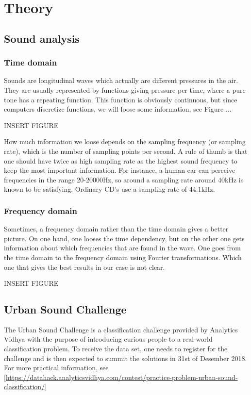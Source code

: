 \section{Theory} \label{sec:theory}

\subsection{Sound analysis}

\subsubsection{Time domain}
Sounds are longitudinal waves which actually are different pressures in the air. They are usually represented by functions giving pressure per time, where a pure tone has a repeating function. This function is obviously continuous, but since computers discretize functions, we will loose some information, see Figure ...

INSERT FIGURE

How much information we loose depends on the sampling frequency (or sampling rate), which is the number of sampling points per second. A rule of thumb is that one should have twice as high sampling rate as the highest sound frequency to keep the most important information. For instance, a human ear can perceive frequencies in the range 20-20000Hz, so around a sampling rate around 40kHz is known to be satisfying. Ordinary CD's use a sampling rate of 44.1kHz. 

\subsubsection{Frequency domain}
Sometimes, a frequency domain rather than the time domain gives a better picture. On one hand, one looses the time dependency, but on the other one gets information about which frequencies that are found in the wave. One goes from the time domain to the frequency domain using Fourier transformations. Which one that gives the best results in our case is not clear. 

INSERT FIGURE

\subsection{Urban Sound Challenge}
The Urban Sound Challenge is a classification challenge provided by Analytics Vidhya with the purpose of introducing curious people to a real-world classification problem. To receive the data set, one needs to register for the challenge and is then expected to summit the solutions in 31st of Desember 2018. For more practical information, see [\url{https://datahack.analyticsvidhya.com/contest/practice-problem-urban-sound-classification/}]

